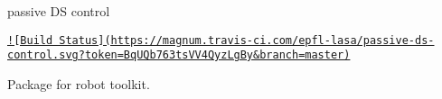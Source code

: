 passive D\+S control

\href{https://magnum.travis-ci.com/epfl-lasa/passive-ds-control}{\tt !\mbox{[}Build Status\mbox{]}(https\+://magnum.\+travis-\/ci.\+com/epfl-\/lasa/passive-\/ds-\/control.\+svg?token=\+Bq\+U\+Qb763ts\+V\+V4\+Qyz\+Lg\+By\&branch=master)}

Package for robot toolkit. 